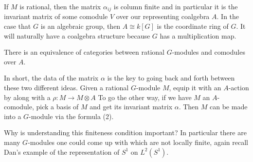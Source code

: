 \documentclass[12pt]{article}
\begin{document}
If $M$ is rational, then the matrix $\alpha_{ij}$ is column finite and in particular it is the invariant matrix of some comodule $V$ over our representing coalgebra $A$. In the case that $G$ is an algebraic group, then $A\cong k[G]$ is the coordinate ring of $G$. It will naturally have a coalgebra structure because $G$ has a multiplication map.

\begin{theorem}
    There is an equivalence of categories between rational $G$-modules and comodules over $A$.
\end{theorem}
In short, the data of the matrix $\alpha$ is the key to going back and forth between these two different ideas. Given a rational $G$-module $M$, equip it with an $A$-action by  along with a $\rho:M\to M\otimes A$  To go the other way, if we have $M$ an $A$-comodule, pick a basis of $M$ and get its invariant matrix $\alpha$. Then $M$ can be made into a $G$-module via the formula (2).

\hfill

Why is understanding this finiteness condition important? In particular there are many $G$-modules one could come up with which are not locally finite, again recall Dan's example of the representation of $S^1$ on $L^2(S^1)$. 
\end{document}
